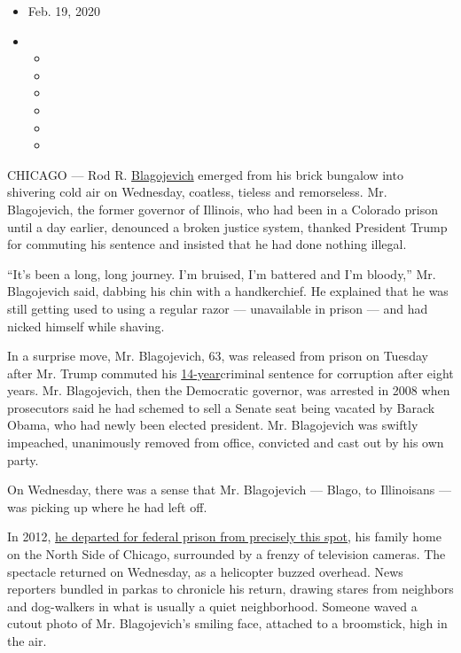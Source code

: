 \begin{itemize}
\item
  Feb. 19, 2020
\item
  \begin{itemize}
  \item
  \item
  \item
  \item
  \item
  \item
  \end{itemize}
\end{itemize}

CHICAGO --- Rod R.
\href{https://www.nytimes.com/2020/02/18/us/rod-blagojevich-sentence.html}{Blagojevich}
emerged from his brick bungalow into shivering cold air on Wednesday,
coatless, tieless and remorseless. Mr. Blagojevich, the former governor
of Illinois, who had been in a Colorado prison until a day earlier,
denounced a broken justice system, thanked President Trump for commuting
his sentence and insisted that he had done nothing illegal.

``It's been a long, long journey. I'm bruised, I'm battered and I'm
bloody,'' Mr. Blagojevich said, dabbing his chin with a handkerchief. He
explained that he was still getting used to using a regular razor ---
unavailable in prison --- and had nicked himself while shaving.

In a surprise move, Mr. Blagojevich, 63, was released from prison on
Tuesday after Mr. Trump commuted his
\href{https://www.nytimes.com/2011/12/08/us/blagojevich-expresses-remorse-in-courtroom-speech.html}{14-year}criminal
sentence for corruption after eight years. Mr. Blagojevich, then the
Democratic governor, was arrested in 2008 when prosecutors said he had
schemed to sell a Senate seat being vacated by Barack Obama, who had
newly been elected president. Mr. Blagojevich was swiftly impeached,
unanimously removed from office, convicted and cast out by his own
party.

On Wednesday, there was a sense that Mr. Blagojevich --- Blago, to
Illinoisans --- was picking up where he had left off.

In 2012,
\href{https://www.nytimes.com/2012/03/15/us/blagojevich-to-begin-prison-term-for-corruption.html}{he
departed for federal prison from precisely this spot}, his family home
on the North Side of Chicago, surrounded by a frenzy of television
cameras. The spectacle returned on Wednesday, as a helicopter buzzed
overhead. News reporters bundled in parkas to chronicle his return,
drawing stares from neighbors and dog-walkers in what is usually a quiet
neighborhood. Someone waved a cutout photo of Mr. Blagojevich's smiling
face, attached to a broomstick, high in the air.

